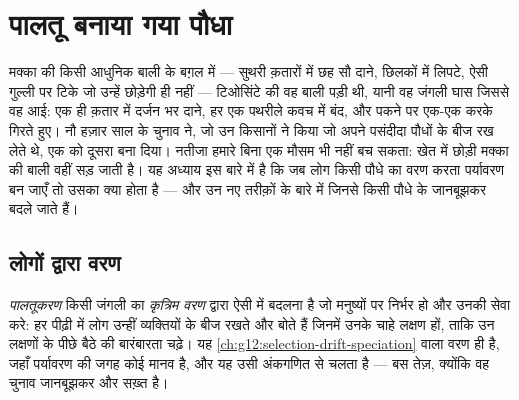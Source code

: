 \chapter{पालतू बनाया गया पौधा}\label{ch:g12:domesticated-plants}

मक्का की किसी आधुनिक बाली के बग़ल में --- सुथरी क़तारों में छह सौ दाने,
छिलकों में लिपटे, ऐसी गुल्ली पर टिके जो उन्हें छोड़ेगी ही नहीं --- टिओसिंटे
की वह बाली पड़ी थी, यानी वह जंगली घास जिससे वह आई: एक ही क़तार में दर्जन भर
दाने, हर एक पथरीले कवच में बंद, और पकने पर एक-एक करके गिरते हुए। नौ हज़ार
साल के चुनाव ने, जो उन किसानों ने किया जो अपने पसंदीदा पौधों के बीज रख
लेते थे, एक को दूसरा बना दिया। नतीजा हमारे बिना एक मौसम भी नहीं बच सकता:
खेत में छोड़ी मक्का की बाली वहीं सड़ जाती है। यह अध्याय इस बारे में है कि
जब लोग किसी पौधे का वरण करता पर्यावरण बन जाएँ तो उसका क्या होता है --- और उन
नए तरीक़ों के बारे में जिनसे किसी पौधे के  जानबूझकर बदले जाते हैं।

\section{लोगों द्वारा वरण}

\begin{definition}\label{def:g12:domesticated-plants:domestication}
\emph{पालतूकरण} किसी जंगली  का \emph{कृत्रिम
वरण} द्वारा ऐसी  में बदलना है जो मनुष्यों पर निर्भर
हो और उनकी सेवा करे: हर पीढ़ी में लोग उन्हीं व्यक्तियों के बीज रखते और बोते
हैं जिनमें उनके चाहे लक्षण हों, ताकि उन लक्षणों के पीछे बैठे 
की बारंबारता चढ़े। यह \cref{ch:g12:selection-drift-speciation} वाला वरण
ही है, जहाँ पर्यावरण की जगह कोई मानव  है, और यह उसी अंकगणित से चलता है
--- बस तेज़, क्योंकि वह चुनाव जानबूझकर और सख़्त है।
\end{definition}

